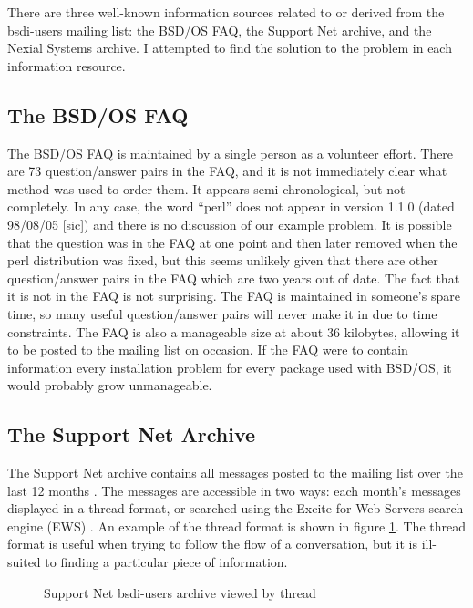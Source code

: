 There are three well-known information sources related to or derived from the
bsdi-users mailing list: the BSD/OS FAQ, the Support Net archive, and the
Nexial Systems archive. I attempted to find the solution to the problem in
each information resource.

\subsection{The BSD/OS FAQ}
The BSD/OS FAQ \cite{bsdi-FAQ} is maintained by a single person as a volunteer
effort. There are 73 question/answer pairs in the FAQ, and it is not
immediately clear what method was used to order them. It appears
semi-chronological, but not completely. In any case, the word ``perl'' does not
appear in version 1.1.0 (dated 98/08/05 [sic]) and there is no discussion of
our example problem. It is possible that the question was in the FAQ at one
point and then later removed when the perl distribution was fixed, but this
seems unlikely given that there are other question/answer pairs in the FAQ
which are two years out of date. The fact that it is not in the FAQ is not
surprising. The FAQ is maintained in someone's spare time, so many useful
question/answer pairs will never make it in due to time constraints. The FAQ is 
also a manageable size at about 36 kilobytes, allowing it to be posted to the
mailing list on occasion. If the FAQ were to contain information every
installation problem for every package used with BSD/OS, it would probably grow 
unmanageable.

\subsection{The Support Net Archive}
The Support Net archive contains all messages posted to the mailing list over
the last 12 months \cite{supportnet-bsdi}. The messages are accessible in two
ways: each month's messages displayed in a thread format, or searched using the
Excite for Web Servers search engine (EWS) \cite{ews-website}. An example of
the thread format is shown in figure \ref{fig:supportnet-thread}. The thread
format is useful when trying to follow the flow of a conversation, but it is
ill-suited to finding a particular piece of information.

\begin{figure}[htbp]
  {\centerline {}}
  \caption{Support Net bsdi-users archive viewed by thread}
  \label{fig:supportnet-thread}
\end{figure}

